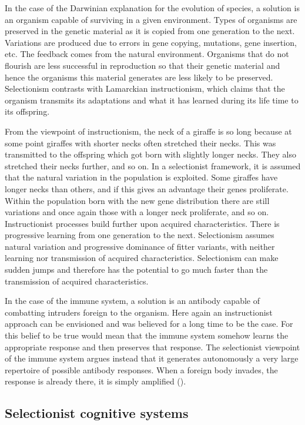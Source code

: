 In the case of the Darwinian explanation for the 
evolution of species, a solution is an organism 
capable of surviving in a given environment. Types 
of organisms are preserved in the genetic material as 
it is copied from one generation to the next. 
Variations are produced due to errors in gene copying, 
mutations, gene insertion, etc. The feedback comes
from the natural environment. Organisms that do not flourish are
less successful in reproduction so that their
genetic material and hence the organisms 
this material generates are less likely to be preserved. 
Selectionism contrasts with Lamarckian instructionism, which 
claims that the organism transmits its adaptations 
and what it has learned during its life time to 
its offspring. 

From the viewpoint of instructionism, the
neck of a giraffe is so long because at some point
giraffes with shorter necks often stretched
their necks. This was transmitted
to the offspring which got born with slightly longer necks.
They also stretched their necks further, 
and so on. In a selectionist framework, it is assumed
that the natural variation in the population 
is exploited. Some giraffes have longer necks than 
others, and if this gives an advantage 
their genes proliferate. Within the population born with the 
new gene distribution there are still variations and 
once again those with a longer neck proliferate, and so on. 
Instructionist processes build further upon acquired characteristics. 
There is progressive learning from one 
generation to the next. Selectionism assumes natural 
variation and progressive dominance of fitter variants, with 
neither learning nor transmission of acquired characteristics. 
Selectionism can make sudden jumps and therefore has the 
potential to go much faster than the transmission of acquired
characteristics. 

In the case of the immune system, a solution is an 
antibody capable of combatting intruders foreign to the 
organism. Here again an instructionist approach can 
be envisioned and was believed for a long time to be 
the case. For this belief to be true would mean that
the immune system somehow learns the appropriate response
and then preserves that response. The selectionist viewpoint
of the immune system argues instead that it
generates autonomously 
a very large repertoire of possible antibody responses. 
When a foreign body invades, the response 
is already 
there, it is simply amplified (\cite{Varela:1988}). 

\subsection{Selectionist cognitive systems}


